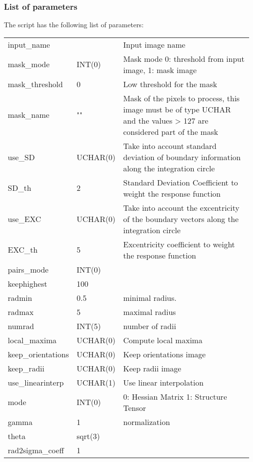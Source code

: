 \documentclass{article}
\begin{document}
\subsubsection{List of parameters}
The script has the following list of parameters:
\begin{tabular}{lll}
  \hline
    input\_name     &         & Input image name \\
    mask\_mode      &  INT(0) & Mask mode 0: threshold from input image, 1: mask image \\
    mask\_threshold & 0       & Low threshold for the mask \\
    mask\_name      & ""      & Mask of the pixels to process, this image must be of type UCHAR and the values > 127 are considered part of the mask \\
    use\_SD         & UCHAR(0)& Take into account standard deviation of boundary information along the integration circle \\
    SD\_th          & 2       & Standard Deviation Coefficient to weight the response function \\
    use\_EXC        & UCHAR(0)&  Take into account the excentricity of the boundary vectors along the integration circle\\
    EXC\_th         & 5       &  Excentricity coefficient to weight the response function \\
    pairs\_mode        & INT(0)\\
    keephighest       & 100 \\
    radmin            & 0.5      & minimal radius.\\
    radmax            & 5        & maximal radius\\
    numrad            & INT(5)   & number of radii\\
    local\_maxima      & UCHAR(0) & Compute local maxima\\
    keep\_orientations & UCHAR(0) & Keep orientations image\\
    keep\_radii        & UCHAR(0) & Keep radii image\\
    use\_linearinterp  & UCHAR(1) & Use linear interpolation\\
    mode              & INT(0)   & 0: Hessian Matrix 1: Structure Tensor\\
    gamma             & 1        & normalization\\
    theta             & sqrt(3)  \\
    rad2sigma\_coeff   & 1 \\

\end{tabular}
\end{document}

